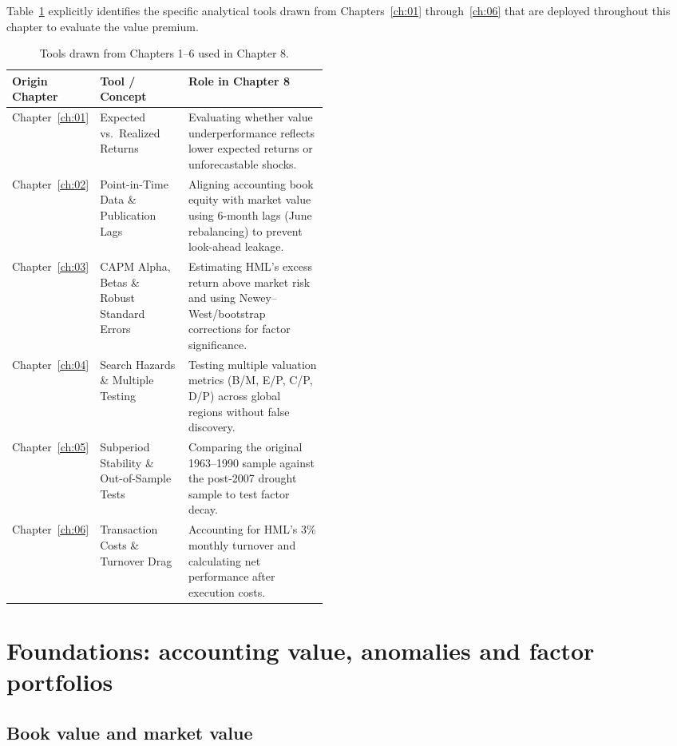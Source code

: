 Table~\ref{tab:08-tools} explicitly identifies the specific analytical tools drawn from Chapters~\ref{ch:01} through~\ref{ch:06} that are deployed throughout this chapter to evaluate the value premium.

\begin{table}[htbp]
\centering
\small
\caption{Tools drawn from Chapters 1--6 used in Chapter 8.}
\label{tab:08-tools}
\begin{tabularx}{0.95\linewidth}{@{}>{\raggedright\arraybackslash}p{0.18\linewidth}>{\raggedright\arraybackslash}p{0.28\linewidth}>{\raggedright\arraybackslash}X@{}}
\toprule
Origin Chapter & Tool / Concept & Role in Chapter 8 \\
\midrule
Chapter~\ref{ch:01} & Expected vs.\ Realized Returns & Evaluating whether value underperformance reflects lower expected returns or unforecastable shocks. \\
Chapter~\ref{ch:02} & Point-in-Time Data \& Publication Lags & Aligning accounting book equity with market value using 6-month lags (June rebalancing) to prevent look-ahead leakage. \\
Chapter~\ref{ch:03} & CAPM Alpha, Betas \& Robust Standard Errors & Estimating HML's excess return above market risk and using Newey--West/bootstrap corrections for factor significance. \\
Chapter~\ref{ch:04} & Search Hazards \& Multiple Testing & Testing multiple valuation metrics (B/M, E/P, C/P, D/P) across global regions without false discovery. \\
Chapter~\ref{ch:05} & Subperiod Stability \& Out-of-Sample Tests & Comparing the original 1963--1990 sample against the post-2007 drought sample to test factor decay. \\
Chapter~\ref{ch:06} & Transaction Costs \& Turnover Drag & Accounting for HML's 3\% monthly turnover and calculating net performance after execution costs. \\
\bottomrule
\end{tabularx}
\end{table}

\section{Foundations: accounting value, anomalies and factor portfolios}
\label{sec:08-foundations}

\subsection{Book value and market value}

